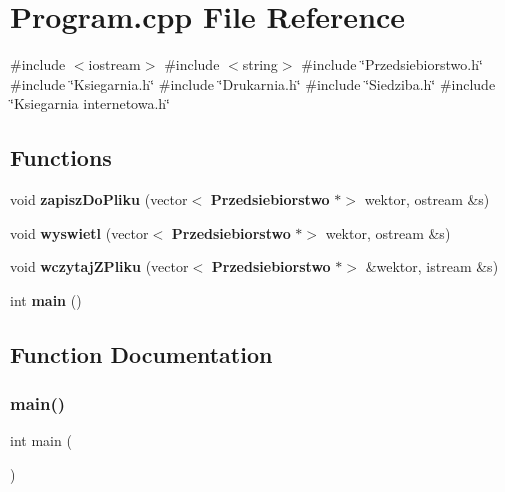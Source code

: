 \section{Program.\+cpp File Reference}
\label{_program_8cpp}
{\ttfamily \#include $<$iostream$>$}\newline
{\ttfamily \#include $<$string$>$}\newline
{\ttfamily \#include \char`\"{}Przedsiebiorstwo.\+h\char`\"{}}\newline
{\ttfamily \#include \char`\"{}Ksiegarnia.\+h\char`\"{}}\newline
{\ttfamily \#include \char`\"{}Drukarnia.\+h\char`\"{}}\newline
{\ttfamily \#include \char`\"{}Siedziba.\+h\char`\"{}}\newline
{\ttfamily \#include \char`\"{}Ksiegarnia internetowa.\+h\char`\"{}}\newline
\subsection*{Functions}
\begin{DoxyCompactItemize}
\item 
void \textbf{ zapisz\+Do\+Pliku} (vector$<$ \textbf{ Przedsiebiorstwo} $\ast$$>$ wektor, ostream \&s)
\item 
void \textbf{ wyswietl} (vector$<$ \textbf{ Przedsiebiorstwo} $\ast$$>$ wektor, ostream \&s)
\item 
void \textbf{ wczytaj\+Z\+Pliku} (vector$<$ \textbf{ Przedsiebiorstwo} $\ast$$>$ \&wektor, istream \&s)
\item 
int \textbf{ main} ()
\end{DoxyCompactItemize}


\subsection{Function Documentation}
\mbox{\label{_program_8cpp_ae66f6b31b5ad750f1fe042a706a4e3d4}} 
\subsubsection{main()}
{\footnotesize\ttfamily int main (\begin{DoxyParamCaption}{ }\end{DoxyParamCaption})}

\mbox{\label{_program_8cpp_ad95cde8df9b23367d6c62ffba7635369}} 
